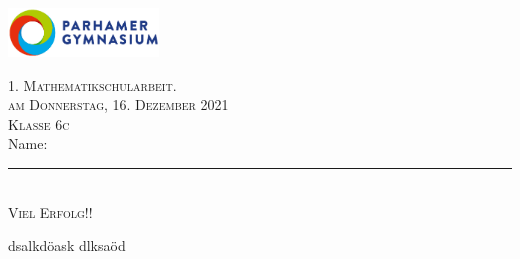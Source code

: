 \documentclass[a4paper,12pt]{article}
\begin{document}
\begin{titlepage}
\begin{flushright}
\includegraphics[width=0.3\textwidth]{logo.eps}

\Huge \textsc{1. Mathematikschularbeit.} \\

\textsc{\Large am Donnerstag, 16. Dezember 2021} \\

\textsc{\Large Klasse 6c} \\ [0.5cm]

\Large Name: \rule{8cm}{0.4pt} \\

\Large \textsc{Viel Erfolg!!}
\end{flushright}

\vfil 

%
%
%


\end{titlepage}
				
				
				
dsalkdöask
dlksaöd
\end{document}
